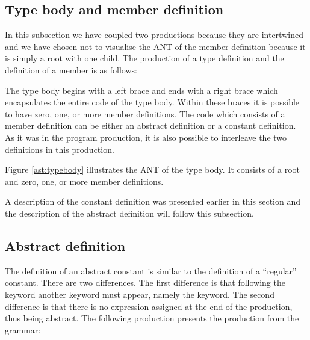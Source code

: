 \subsection{Type body and member definition}

In this subsection we have coupled two productions because they are intertwined
and we have chosen not to visualise the ANT of the member definition because it
is simply a root with one child. The production of a type definition and the
definition of a member is as follows:

\begin{ebnf}
\end{ebnf}

The type body begins with a left brace and ends with a right brace which
encapsulates the entire code of the type body. Within these braces it is
possible to have zero, one, or more member definitions. The code which consists
of a member definition can be either an abstract definition or a constant
definition. As it was in the program production, it is also possible to
interleave the two definitions in this production.



Figure \ref{ast:typebody} illustrates the ANT of the type body. It consists of a
root and zero, one, or more member definitions.

A description of the constant definition was presented earlier in this section
and the description of the abstract definition will follow this subsection.

\subsection{Abstract definition}
The definition of an abstract constant is similar to the definition of a
``regular'' constant. There are two differences. The first difference is that
following the  keyword another keyword must appear, namely the
 keyword. The second difference is that there is no expression
assigned at the end of the production, thus being abstract. The following
production presents the production from the grammar:

\begin{ebnf}
\end{ebnf}

